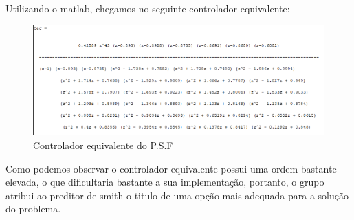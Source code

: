 \documentclass[a4paper,12pt]{article}
\begin{document}
Utilizando o matlab, chegamos no seguinte controlador equivalente:

\begin{figure} [H]
    \centering
    \includegraphics[width=0.9\linewidth]{image11.png}
    \caption{Controlador equivalente do P.S.F}
    \label{fig:enter-label}
\end{figure}

Como podemos observar o controlador equivalente possui uma ordem bastante elevada, o que dificultaria bastante a sua implementação, portanto, o grupo atribui ao preditor de smith o titulo de uma opção mais adequada para a solução do problema.
\end{document}
